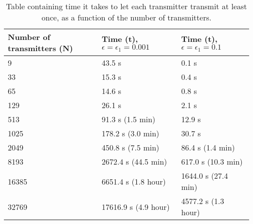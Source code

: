 \begin{table}[h]
	\centering
	\begin{tabular}{  | l | l | l | }

		\hline
		Number of transmitters (N)	& Time (t), $\epsilon = \epsilon_1 = 0.001$	& Time (t), $\epsilon = \epsilon_1 = 0.1$		\\ \hline

		9							& 43.5 s									& 0.1 s 										\\ \hline
		33							& 15.3 s									& 0.4 s											\\ \hline
		65							& 14.6 s									& 0.8 s											\\ \hline
		129							& 26.1 s									& 2.1 s											\\ \hline
		513							& 91.3 s (1.5 min)							& 12.9 s										\\ \hline
		1025						& 178.2 s	(3.0 min)						& 30.7 s										\\ \hline
		2049						& 450.8 s	(7.5 min)						& 86.4 s (1.4 min)								\\ \hline
		8193						& 2672.4 s (44.5 min)						& 617.0 s (10.3 min)							\\ \hline
		16385						& 6651.4 s (1.8 hour)						& 1644.0 s (27.4 min)							\\ \hline
		32769						& 17616.9 s (4.9 hour)						& 4577.2 s (1.3 hour)							\\ \hline


	\end{tabular}
	\caption{Table containing time it takes to let each transmitter transmit at least once, as a function of the number of transmitters.}
	\label{tbl:time-as-function-N}
\end{table}

